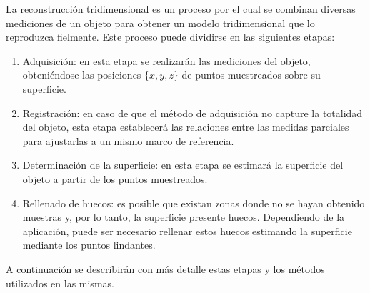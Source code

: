 La reconstrucción tridimensional es un proceso por el cual se combinan diversas mediciones de un objeto
para obtener un modelo tridimensional que lo reproduzca fielmente.
Este proceso puede dividirse en las siguientes etapas:
\begin{enumerate}
	\item Adquisición: en esta etapa se realizarán las mediciones del objeto,
		obteniéndose las posiciones $\{x, y, z\}$ de puntos muestreados sobre su superficie.
	\item Registración: en caso de que el método de adquisición no capture la totalidad del objeto,
		esta etapa establecerá las relaciones entre las medidas parciales
		para ajustarlas a un mismo marco de referencia.
	\item Determinación de la superficie: en esta etapa se estimará la superficie del objeto
		a partir de los puntos muestreados.
	\item Rellenado de huecos: es posible que existan zonas donde
		no se hayan obtenido muestras y, por lo tanto, la superficie presente huecos.
		Dependiendo de la aplicación, puede ser necesario rellenar estos huecos
		estimando la superficie mediante los puntos lindantes.
\end{enumerate}

A continuación se describirán con más detalle estas etapas y los métodos utilizados en las mismas.




